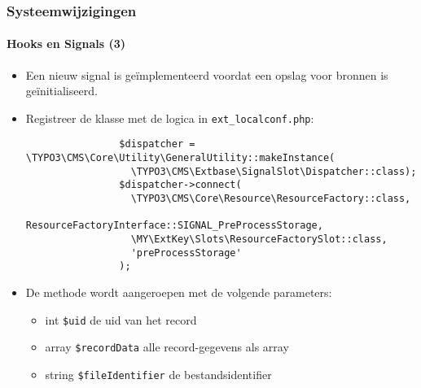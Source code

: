 \begin{frame}[fragile]
	\frametitle{Systeemwijzigingen}
	\framesubtitle{Hooks en Signals (3)}

	\lstset{basicstyle=\tiny\ttfamily}

	\begin{itemize}

		\item Een nieuw signal is geïmplementeerd voordat een opslag voor bronnen is geïnitialiseerd.

		\item Registreer de klasse met de logica in \texttt{ext\_localconf.php}:

			\begin{lstlisting}
				$dispatcher = \TYPO3\CMS\Core\Utility\GeneralUtility::makeInstance(
				  \TYPO3\CMS\Extbase\SignalSlot\Dispatcher::class);
				$dispatcher->connect(
				  \TYPO3\CMS\Core\Resource\ResourceFactory::class,
				  ResourceFactoryInterface::SIGNAL_PreProcessStorage,
				  \MY\ExtKey\Slots\ResourceFactorySlot::class,
				  'preProcessStorage'
				);
			\end{lstlisting}

		\item De methode wordt aangeroepen met de volgende parameters:

			\begin{itemize}
				\item int \texttt{\$uid} de uid van het record
				\item array \texttt{\$recordData} alle record-gegevens als array
				\item string \texttt{\$fileIdentifier} de bestandsidentifier
			\end{itemize}

	\end{itemize}

\end{frame}

